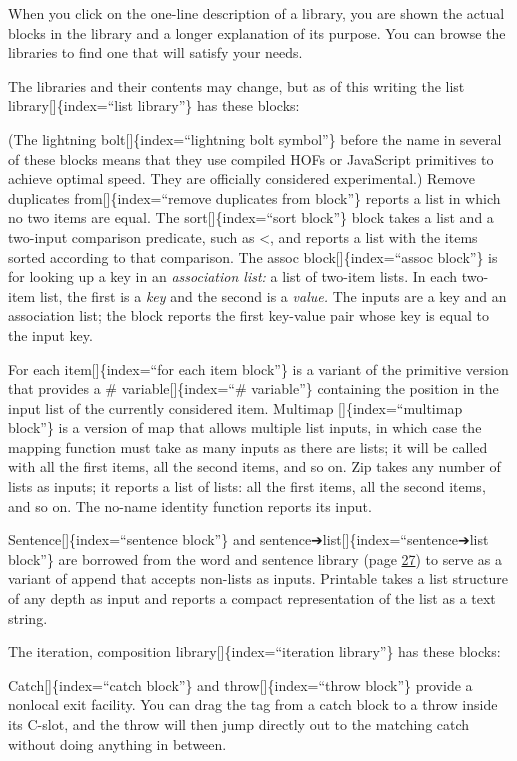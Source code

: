 \documentclass[
  letterpaper,
]{book}
\begin{document}
When you click on the one-line description of a library, you are shown
the actual blocks in the library and a longer explanation of its
purpose. You can browse the libraries to find one that will satisfy your
needs.

The libraries and their contents may change, but as of this writing the
list library{[}{]}\{index=``list library''\} has these blocks:

(The lightning bolt{[}{]}\{index=``lightning bolt symbol''\} before the
name in several of these blocks means that they use compiled HOFs or
JavaScript primitives to achieve optimal speed. They are officially
considered experimental.) Remove duplicates from{[}{]}\{index=``remove
duplicates from block''\} reports a list in which no two items are
equal. The sort{[}{]}\{index=``sort block''\} block takes a list and a
two-input comparison predicate, such as \textless, and reports a list
with the items sorted according to that comparison. The assoc
block{[}{]}\{index=``assoc block''\} is for looking up a key in an
\emph{association list:} a list of two-item lists. In each two-item
list, the first is a \emph{key} and the second is a \emph{value.} The
inputs are a key and an association list; the block reports the first
key-value pair whose key is equal to the input key.

For each item{[}{]}\{index=``for each item block''\} is a variant of the
primitive version that provides a \# variable{[}{]}\{index=``\#
variable''\} containing the position in the input list of the currently
considered item. Multimap {[}{]}\{index=``multimap block''\} is a
version of map that allows multiple list inputs, in which case the
mapping function must take as many inputs as there are lists; it will be
called with all the first items, all the second items, and so on. Zip
takes any number of lists as inputs; it reports a list of lists: all the
first items, all the second items, and so on. The no-name identity
function reports its input.

Sentence{[}{]}\{index=``sentence block''\} and
sentence➔list{[}{]}\{index=``sentence➔list block''\} are borrowed from
the word and sentence library (page \hyperref[wordsent]{27}) to serve as
a variant of append that accepts non-lists as inputs. Printable takes a
list structure of any depth as input and reports a compact
representation of the list as a text string.

The iteration, composition library{[}{]}\{index=``iteration library''\}
has these blocks:

Catch{[}{]}\{index=``catch block''\} and throw{[}{]}\{index=``throw
block''\} provide a nonlocal exit facility. You can drag the tag from a
catch block to a throw inside its C-slot, and the throw will then jump
directly out to the matching catch without doing anything in between.
\end{document}
